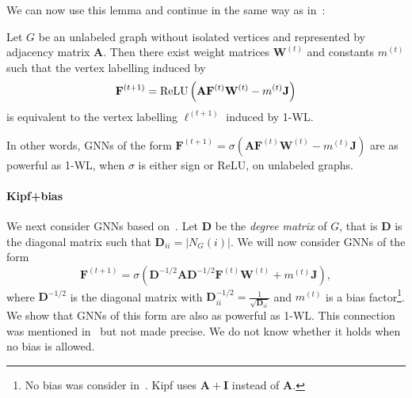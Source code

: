 We can now use this lemma and continue in the same way as in~\cite{grohewl}:
\begin{theorem}\label{thm:relu}
Let $G$ be an unlabeled graph without isolated vertices and represented by adjacency matrix $\mathbf{A}$. Then there exist weight matrices $\mathbf{W}^{(t)}$
and constants $m^{(t)}$ such that the vertex labelling induced by 
\begin{equation}
  \mathbf{F}^{(t+1)} = \text{\normalfont ReLU}\left(
    \mathbf{A}\mathbf{F}^{(t)}\mathbf{W}^{(t)} - m^{(t)}\mathbf{J}  \right)
\end{equation}
is equivalent to the vertex labelling $\ell^{(t+1)}$ induced by 1-WL.
\end{theorem}
In other words, GNNs of the form   $\mathbf{F}^{(t+1)} = \sigma\left(
    \mathbf{A}\mathbf{F}^{(t)}\mathbf{W}^{(t)} - m^{(t)}\mathbf{J}  \right)$
are as powerful as 1-WL, when $\sigma$ is either sign or ReLU, on unlabeled graphs.

\paragraph{Kipf+bias}
We next consider GNNs based on~\cite{kipf-loose}. Let $\mathbf{D}$ be the \emph{degree matrix} of $G$, that is $\mathbf{D}$
is the diagonal matrix such that
$    \mathbf{D}_{ii} = |N_G(i)|$. We will now consider GNNs of the form
\begin{equation}\label{GNN:Kipf}
    \mathbf{F}^{(t+1)} = \sigma\left(
        \mathbf{D}^{-1/2}\mathbf{A}\mathbf{D}^{-1/2}
        \mathbf{F}^{(t)}\mathbf{W}^{(t)} + m^{(t)}\mathbf{J}
    \right),
\end{equation}
where $\mathbf{D}^{-1/2}$
is the diagonal matrix with
$\mathbf{D}^{-1/2}_{ii} =
\frac{1}{\sqrt{\mathbf{D}_{ii}}}$ and $m^{(t)}$ is a bias factor\footnote{No bias was consider in~\cite{kipf-loose}. Kipf uses $\mathbf{A}+\mathbf{I}$ instead of $\mathbf{A}$.}.
We show that GNNs of this form are also as powerful as 1-WL. This connection was mentioned in~\cite{kipf-loose} but not made precise. We do not know whether it holds when no bias is allowed.

